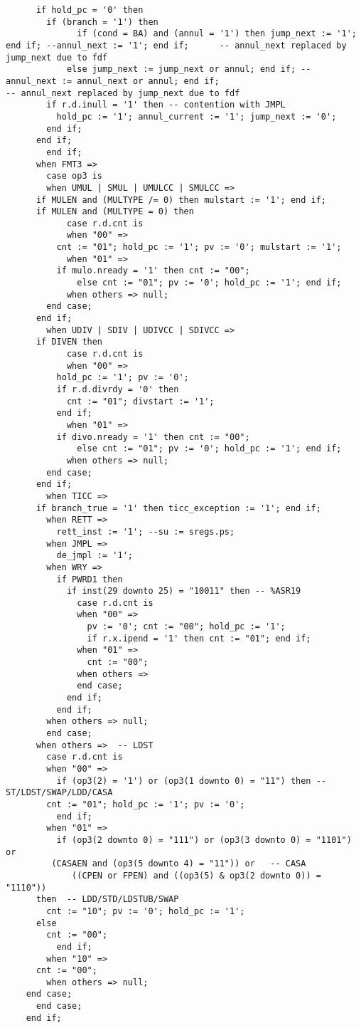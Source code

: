 \begin{lstlisting}
	  if hold_pc = '0' then
  	    if (branch = '1') then
              if (cond = BA) and (annul = '1') then jump_next := '1'; end if; --annul_next := '1'; end if;		-- annul_next replaced by jump_next due to fdf
            else jump_next := jump_next or annul; end if; -- annul_next := annul_next or annul; end if; 							-- annul_next replaced by jump_next due to fdf
	    if r.d.inull = '1' then -- contention with JMPL
	      hold_pc := '1'; annul_current := '1'; jump_next := '0';
	    end if;
	  end if;
        end if;
      when FMT3 =>
        case op3 is
        when UMUL | SMUL | UMULCC | SMULCC =>
	  if MULEN and (MULTYPE /= 0) then mulstart := '1'; end if;
	  if MULEN and (MULTYPE = 0) then
            case r.d.cnt is
            when "00" =>
 	      cnt := "01"; hold_pc := '1'; pv := '0'; mulstart := '1';
            when "01" =>
 	      if mulo.nready = '1' then cnt := "00";
              else cnt := "01"; pv := '0'; hold_pc := '1'; end if;
            when others => null;
	    end case;
	  end if;
        when UDIV | SDIV | UDIVCC | SDIVCC =>
	  if DIVEN then
            case r.d.cnt is
            when "00" =>
 	      hold_pc := '1'; pv := '0';
	      if r.d.divrdy = '0' then
 	        cnt := "01"; divstart := '1';
	      end if;
            when "01" =>
 	      if divo.nready = '1' then cnt := "00"; 
              else cnt := "01"; pv := '0'; hold_pc := '1'; end if;
            when others => null;
	    end case;
	  end if;
        when TICC =>
	  if branch_true = '1' then ticc_exception := '1'; end if;
        when RETT =>
          rett_inst := '1'; --su := sregs.ps; 
        when JMPL =>
          de_jmpl := '1';
        when WRY =>
          if PWRD1 then 
            if inst(29 downto 25) = "10011" then -- %ASR19
              case r.d.cnt is
              when "00" =>
                pv := '0'; cnt := "00"; hold_pc := '1';
                if r.x.ipend = '1' then cnt := "01"; end if;              
              when "01" =>
                cnt := "00";
              when others =>
              end case;
            end if;
          end if;
        when others => null;
        end case;
      when others =>  -- LDST 
        case r.d.cnt is
        when "00" =>
          if (op3(2) = '1') or (op3(1 downto 0) = "11") then -- ST/LDST/SWAP/LDD/CASA
 	    cnt := "01"; hold_pc := '1'; pv := '0';
          end if;
        when "01" =>
          if (op3(2 downto 0) = "111") or (op3(3 downto 0) = "1101") or
	     (CASAEN and (op3(5 downto 4) = "11")) or	-- CASA
             ((CPEN or FPEN) and ((op3(5) & op3(2 downto 0)) = "1110"))
	  then	-- LDD/STD/LDSTUB/SWAP
 	    cnt := "10"; pv := '0'; hold_pc := '1';
	  else
 	    cnt := "00";
          end if;
        when "10" =>
 	  cnt := "00";
        when others => null;
	end case;
      end case;
    end if;


\end{lstlisting}
